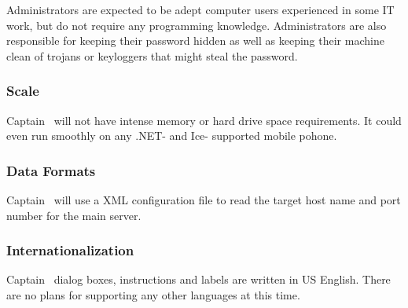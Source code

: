 Administrators are expected to be adept computer users experienced in some IT work, but do not require any programming knowledge. Administrators are also responsible for keeping their password hidden as well as keeping their machine clean of trojans or keyloggers that might steal the password.

\subsubsection*{Scale}

Captain \VTank\ will not have intense memory or hard drive space requirements. It could even run smoothly on any .NET- and Ice- supported mobile pohone.

\subsubsection*{Data Formats}

Captain \VTank\ will use a XML configuration file to read the target host name and port number for the main server.

\subsubsection*{Internationalization}

Captain \VTank\ dialog boxes, instructions and labels are written in US English. There are no plans for supporting any other languages at this time.

\placeholder